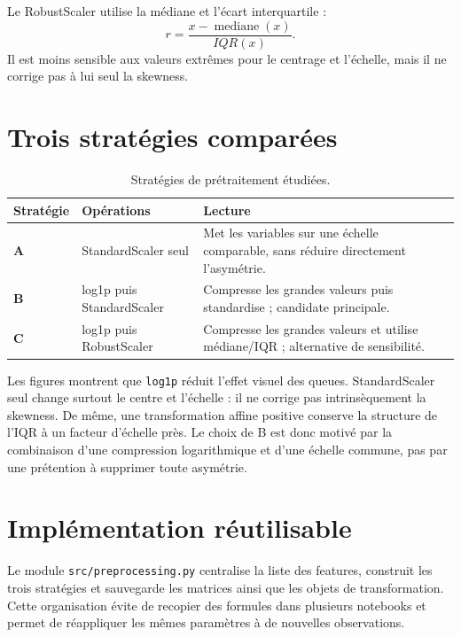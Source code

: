 Le RobustScaler utilise la médiane et l'écart interquartile :
\begin{equation}
r=\frac{x-\operatorname{mediane}(x)}{IQR(x)}.
\end{equation}
Il est moins sensible aux valeurs extrêmes pour le centrage et l'échelle, mais il ne corrige pas à lui seul la skewness.

\section{Trois stratégies comparées}
\begin{table}[H]
\centering
\caption{Stratégies de prétraitement étudiées.}
\label{tab:strategies}
\begin{tabularx}{\textwidth}{>{\bfseries}l X X}
\toprule
Stratégie & Opérations & Lecture \\
\midrule
A & StandardScaler seul & Met les variables sur une échelle comparable, sans réduire directement l'asymétrie. \\
B & log1p puis StandardScaler & Compresse les grandes valeurs puis standardise ; candidate principale. \\
C & log1p puis RobustScaler & Compresse les grandes valeurs et utilise médiane/IQR ; alternative de sensibilité. \\
\bottomrule
\end{tabularx}
\end{table}



Les figures montrent que \texttt{log1p} réduit l'effet visuel des queues. StandardScaler seul change surtout le centre et l'échelle : il ne corrige pas intrinsèquement la skewness. De même, une transformation affine positive conserve la structure de l'IQR à un facteur d'échelle près. Le choix de B est donc motivé par la combinaison d'une compression logarithmique et d'une échelle commune, pas par une prétention à supprimer toute asymétrie.

\section{Implémentation réutilisable}
Le module \texttt{src/preprocessing.py} centralise la liste des features, construit les trois stratégies et sauvegarde les matrices ainsi que les objets de transformation. Cette organisation évite de recopier des formules dans plusieurs notebooks et permet de réappliquer les mêmes paramètres à de nouvelles observations.

